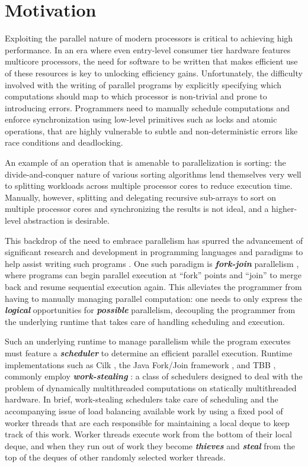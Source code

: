 \documentclass[bsc,frontabs,singlespacing,parskip,deptreport,normalheadings]{infthesis}
\begin{document}
\section{Motivation}

Exploiting the parallel nature of modern processors is critical to achieving
high performance. In an era where even entry-level consumer tier hardware
features multicore processors, the need for software to be written that
makes efficient use of these resources is key to unlocking efficiency gains.
Unfortunately, the difficulty involved with the writing of parallel programs by
explicitly specifying which computations should map to which processor is
non-trivial and prone to introducing errors. Programmers need to manually
schedule computations and enforce synchronization using low-level primitives
such as locks and atomic operations, that are highly vulnerable to subtle and
non-deterministic errors like race conditions and deadlocking.

An example of an operation that is amenable to parallelization is sorting: the
divide-and-conquer nature of various sorting algorithms lend themselves very
well to splitting workloads across multiple processor cores to reduce execution
time. Manually, however, splitting and delegating recursive sub-arrays to sort
on multiple processor cores and synchronizing the results is not ideal, and a
higher-level abstraction is desirable.

This backdrop of the need to embrace parallelism has spurred the advancement of
significant research and development in programming languages and paradigms to
help assist writing such programs \cite{muller_latency-hiding_2016,
zakian_concurrent_2016}. One such paradigm is \textit{\textbf{fork-join}}
parallelism \cite{conway_multiprocessor_1963, nyman_notes_2016}, where programs
can begin parallel execution at ``fork'' points and ``join'' to merge back and
resume sequential execution again. This alleviates the programmer from having to
manually managing parallel computation: one needs to only express the
\textbf{\textit{logical}} opportunities for \textit{\textbf{possible}}
parallelism, decoupling the programmer from the underlying runtime that takes
care of handling scheduling and execution.

Such an underlying runtime to manage parallelism while the program executes must
feature a \textit{\textbf{scheduler}} to determine an efficient parallel
execution. Runtime implementations such as Cilk
\cite{frigo_implementation_1998}, the Java Fork/Join framework
\cite{lea_java_2000}, and TBB \cite{noauthor_advanced_nodate}, commonly employ
\textbf{\textit{work-stealing}} \cite{blumofe_cilk_1995}: a class of schedulers designed to deal with the
problem of dynamically multithreaded computations on statically multithreaded
hardware. In brief, work-stealing schedulers take care
of scheduling and the accompanying issue of load balancing available work by
using a fixed pool of worker threads that are each responsible for maintaining a
local deque to keep track of this work. Worker threads execute work from the
bottom of their local deque, and when they run out of work they become
\textit{\textbf{thieves}} and \textit{\textbf{steal}} from the top of the deques
of other randomly selected worker threads.
\end{document}

